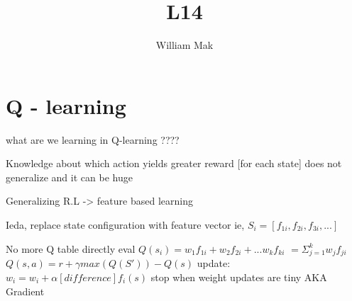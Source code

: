 \documentclass{article}
\title{L14}
\author{William Mak}
\begin{document}
\maketitle
\section{Q - learning}
\begin{enumeration}
	\item what are we learning in Q-learning ????
	\item Knowledge about which action yields greater reward [for each state]
		\subitem does not generalize and it can be huge
	\item Generalizing R.L -> feature based learning
	\item Ieda, replace state configuration with feature vector
		\subitem ie, $S_i = [f_{1i}, f_{2i}, f_{3i}, ...]$
	\item No more Q table
		\subitem directly eval $Q(s_i) = w_1f_{1i} + w_2f_{2i} + ... w_kf_{ki}$
		\subitem $ = \Sigma_{j=1}^{k} w_jf_{ji}$
		\subitem $Q(s, a) = r + \gamma max(Q(S')) - Q(s)$
		\subitem update: $w_i = w_i + \alpha[difference] f_i(s)$
		\subitem stop when weight updates are tiny
		\subitem AKA Gradient
\end{enumeration}
\end{document}
